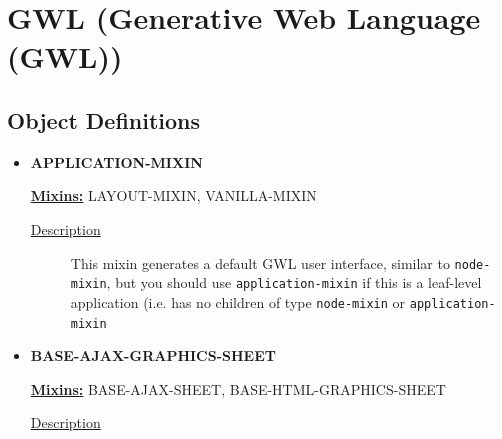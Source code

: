 \documentclass [11pt]{book}
\begin{document}
\section{GWL (Generative Web Language (GWL))}

\label{sec:gwl(generativeweblanguage(gwl))}





\subsection{Object Definitions}

\label{subsec:objectdefinitions}



\begin{itemize}

\item {}
\label{prim:application-mixin}
\textbf{APPLICATION-MIXIN}


\textbf{
\underline{Mixins:}} LAYOUT-MIXIN, VANILLA-MIXIN





\begin{description}

\item [
\underline{Description}]


This mixin generates a default GWL user interface, similar to \texttt{node-mixin}, but you should use
\texttt{application-mixin} if this is a leaf-level application (i.e. has no children of type \texttt{node-mixin}
or \texttt{application-mixin}



\end{description}









\item {}
\label{prim:base-ajax-graphics-sheet}
\textbf{BASE-AJAX-GRAPHICS-SHEET}


\textbf{
\underline{Mixins:}} BASE-AJAX-SHEET, BASE-HTML-GRAPHICS-SHEET





\begin{description}

\item [
\underline{Description}]



\end{description}
\end{itemize}
\end{document}
